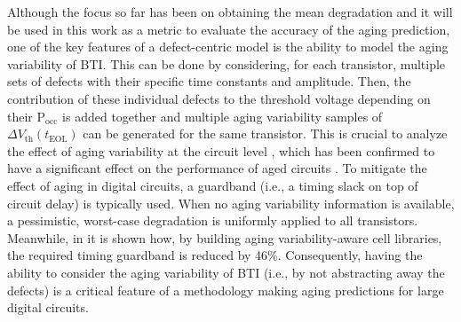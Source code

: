 Although the focus so far has been on obtaining the mean degradation and it will be used in this work as a metric to evaluate the accuracy of the aging prediction, one of the key features of a defect-centric model is the ability to model the aging variability of BTI. This can be done by considering, for each transistor, multiple sets of defects with their specific time constants and amplitude. Then, the contribution of these individual defects to the threshold voltage depending on their $\text{P}_{\text{occ}}$ is added together and multiple aging variability samples of $\Delta V_\text{th}({t_\text{EOL}})$ can be generated for the same transistor. This is crucial to analyze the effect of aging variability at the circuit level \cite{santana-andreoImpactBTIHCI2022,toro-friasFastAccurateReliability2015,vansantenModelingMitigatingTimeDependent2019}, which has been confirmed to have a significant effect on the performance of aged circuits \cite{santana-andreoReliabilityImprovementSRAM2024a, santana-andreoCharacterizingAgingDegradation2022, saraza-canflancaSmartSRAMCellArray2022}. To mitigate the effect of aging in digital circuits, a guardband (i.e., a timing slack on top of circuit delay) is typically used. When no aging variability information is available, a pessimistic, worst-case degradation is uniformly applied to all transistors. Meanwhile, in \cite{vansantenModelingMitigatingTimeDependent2019} it is shown how, by building aging variability-aware cell libraries, the required timing guardband is reduced by 46\%. Consequently, having the ability to consider the aging variability of BTI (i.e., by not abstracting away the defects) is a critical feature of a methodology making aging predictions for large digital circuits. 

